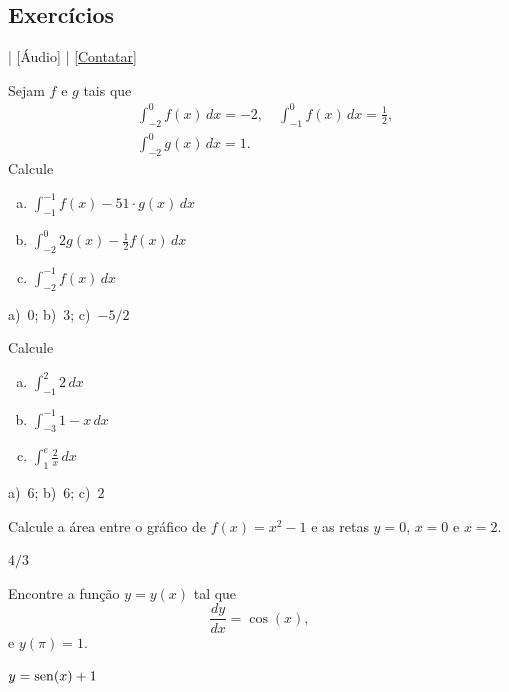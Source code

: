 \subsection*{Exercícios}

\begin{flushright}
  [Vídeo] | [Áudio] | \href{https://phkonzen.github.io/notas/contato.html}{[Contatar]}
\end{flushright}

\begin{exer}
  Sejam $f$ e $g$ tais que
  \begin{align}
    &\int_{-2}^{0} f(x)\,dx = -2,\quad\int_{-1}^{0} f(x)\,dx = \frac{1}{2},\\
    &\int_{-2}^0 g(x)\,dx = 1.
  \end{align}
  Calcule
  \begin{enumerate}[a)]
  \item $\displaystyle \int_{-1}^{-1} f(x) - 51\cdot g(x)\,dx$
  \item $\displaystyle \int_{-2}^{0} 2g(x) - \frac{1}{2}f(x)\,dx$
  \item $\displaystyle \int_{-2}^{-1} f(x)\,dx$
  \end{enumerate}
\end{exer}
\begin{resp}
  a)~$0$; b)~$3$; c)~$-5/2$
\end{resp}

\begin{exer}
  Calcule
  \begin{enumerate}[a)]
  \item $\displaystyle\int_{-1}^2 2\,dx$
  \item $\displaystyle\int_{-3}^{-1} 1-x\,dx$
  \item $\displaystyle\int_{1}^{e} \frac{2}{x}\,dx$
  \end{enumerate}
\end{exer}
\begin{resp}
  a)~$6$; b)~$6$; c)~$2$
\end{resp}

\begin{exer}
  Calcule a área entre o gráfico de $f(x) = x^2-1$ e as retas $y=0$, $x=0$ e $x=2$.
\end{exer}
\begin{resp}
  $4/3$
\end{resp}

\begin{exer}
  Encontre a função $y = y(x)$ tal que
  \begin{equation}
    \frac{dy}{dx} = \cos(x),
  \end{equation}
  e $y(\pi) = 1$.
\end{exer}
\begin{resp}
  $y = \operatorname{sen}(x) + 1$
\end{resp}

